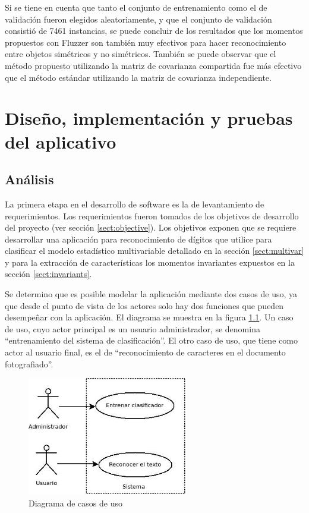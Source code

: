 \documentclass[a4paper, 11pt, oneside]{report}
\begin{document}
Si se tiene en cuenta que tanto el conjunto de entrenamiento como el de validación fueron elegidos aleatoriamente, y que el conjunto de validación consistió de 7461 instancias, se puede concluir de los resultados que los momentos propuestos con Fluzzer son también muy efectivos para hacer reconocimiento entre objetos simétricos y no simétricos. También se puede observar que el método propuesto utilizando la matriz de covarianza compartida fue más efectivo que el método estándar utilizando la matriz de covarianza independiente.

\chapter{Diseño, implementación y pruebas del aplicativo}
\label{chap:ingSw}

\section{Análisis}

La primera etapa en el desarrollo de software es la de levantamiento de requerimientos. Los requerimientos fueron tomados de los objetivos de desarrollo del proyecto (ver sección \ref{sect:objective}). Los objetivos exponen que se requiere desarrollar una aplicación para reconocimiento de dígitos que utilice para clasificar el modelo estadístico multivariable detallado en la sección \ref{sect:multivar} y para la extracción de características los momentos invariantes expuestos en la sección \ref{sect:invariants}.

Se determino que es posible modelar la aplicación mediante dos casos de uso, ya que desde el punto de vista de los actores solo hay dos funciones que pueden desempeñar con la aplicación. El diagrama se muestra en la figura \ref{fig:useCase}. Un caso de uso, cuyo actor principal es un usuario administrador, se denomina ``entrenamiento del sistema de clasificación''. El otro caso de uso, que tiene como actor al usuario final, es el de ``reconocimiento de caracteres en el documento fotografiado''.

\begin{figure}[htb]
\begin{center}
\leavevmode
\includegraphics[width=7cm]{diagrams/casoUso.jpg}
\end{center}
\caption{Diagrama de casos de uso}
\label{fig:useCase}
\end{figure}
\end{document}
